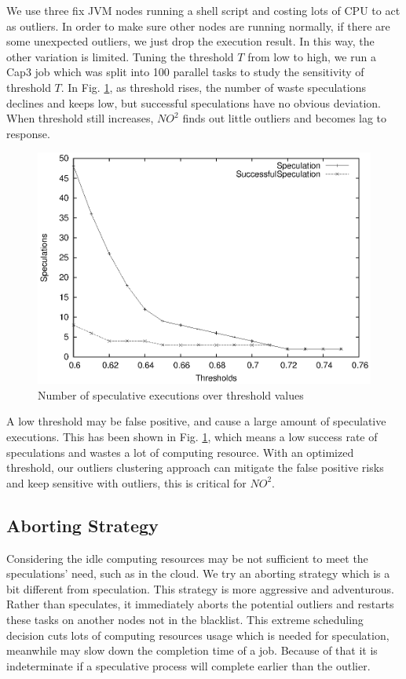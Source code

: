 We use three fix JVM nodes running a shell script and costing lots of CPU to act as outliers.
In order to make sure other nodes are running normally, if there are some unexpected outliers, we
just drop the execution result. In this way, the other variation is limited. Tuning the
threshold $T$ from low to high, we run a Cap3 job which was split into 100 parallel tasks
to study the sensitivity of threshold $T$. In Fig. \ref{figure:thresholdtuning}, as
threshold rises, the number of waste speculations declines and keeps low, but successful
speculations have no obvious deviation. When threshold still increases, $NO^2$ finds out
little outliers and becomes lag to response.

\begin{figure}
\centering
\includegraphics[width=0.9\columnwidth]{figures/threshold&speculation.eps}
\caption{Number of speculative executions over threshold values}
\label{figure:thresholdtuning}
\end{figure}

A low threshold may be false positive, and cause a large amount of speculative executions.
This has been shown in Fig.  \ref{figure:thresholdtuning}, which means a low success rate
of speculations and wastes a lot of computing resource. With an optimized threshold, our
outliers clustering approach can mitigate the false positive risks and keep sensitive with
outliers, this is critical for $NO^2$.

\subsection{Aborting Strategy}

Considering the idle computing resources may be not sufficient to meet the speculations'
need, such as in the cloud. We try an aborting strategy which is a bit different from
speculation. This strategy is more aggressive and adventurous. Rather than speculates, it
immediately aborts the potential outliers and restarts these tasks on another nodes not in
the blacklist. This extreme scheduling decision cuts lots of computing resources usage
which is needed for speculation, meanwhile may slow down the completion time of a job.
Because of that it is indeterminate if a speculative process will complete earlier than
the outlier.

